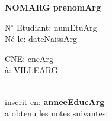 \documentclass[a4paper]{article}
\begin{document}
\thispagestyle{fancy}
\begin{center}
    \setlength{\fboxsep}{10pt}
\end{center}
\vspace{0.8em}
\noindent\textbf{\uppercase{nomArg} prenomArg}
\vspace{0.5em}\\
\begin{minipage}{0.35\textwidth}
N$^\circ$ Etudiant: numEtuArg
\vspace{0.3em}\\
N\'e le: dateNaissArg 
\end{minipage}
\hspace{0.5em}
\begin{minipage}{0.3\textwidth}
CNE\@: cneArg
\vspace{0.3em}\\
\`a: \uppercase{villeArg}
\end{minipage}
\vspace{0.5em}\\
inscrit en: \textbf{anneeEducArg}
\vspace{0.2em}\\
a obtenu les notes suivantes:
\end{document}
